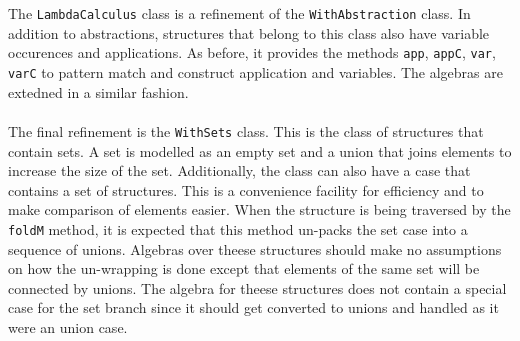 \documentclass[8pt]{extarticle}
\begin{document}
\\\\
The \verb+LambdaCalculus+ class is a refinement of the \verb+WithAbstraction+ class. In addition to abstractions, structures that belong to this class also have variable occurences and applications. As before, it provides the methods \verb+app+, \verb+appC+, \verb+var+, \verb+varC+ to pattern match and construct application and variables. The algebras are extedned in a similar fashion.
\\\\
The final refinement is the \verb+WithSets+ class. This is the class of structures that contain sets. A set is modelled as an empty set and a union that joins elements to increase the size of the set. Additionally, the class can also have a case that contains a set of structures. This is a convenience facility for efficiency and to make comparison of elements easier. When the structure is being traversed by the \verb+foldM+ method, it is expected that this method un-packs the set case into a sequence of unions. Algebras over theese structures should make no assumptions on how the un-wrapping is done except that elements of the same set will be connected by unions. The algebra for theese structures does not contain a special case for the set branch since it should get converted to unions and handled as it were an union case.
\end{document}
